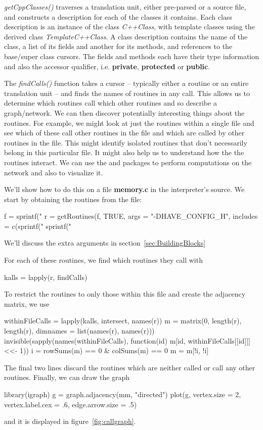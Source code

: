 \documentclass[article]{jss}
\def\Cpp{\proglang{C$++$}}
\def\R{\proglang{R}}
\def\Rpkg#1{\pkg{#1}}
\def\Rfunc#1{\textsl{#1()}}
\def\file#1{\textbf{#1}}
\def\Rclass#1{\textit{#1}}
\def\Cppkeyword#1{\textbf{#1}}
\begin{document}
\Rfunc{getCppClasses} traverses a translation unit, either pre-parsed
or a source file, and constructs a description for each of the \Cpp{}
classes it contains. Each class description is an instance of the
class \Rclass{C++Class}, with template classes using the derived class
\Rclass{TemplateC++Class}.  A class description contains the name of
the class, a list of its fields and another for its methods, and
references to the base/super class cursors.  The fields and methods
each have their type information and also the accessor qualifier,
i.e. \Cppkeyword{private}, \Cppkeyword{protected} or
\Cppkeyword{public}.



The \Rfunc{findCalls} function takes a cursor -- typically either a
routine or an entire translation unit -- and finds the names of
routines in any call.  This allows us to determine which routines call
which other routines and so describe a graph/network.  We can then
discover potentially interesting things about the routines.  For
example, we might look at just the routines within a single file and
see which of these call other routines in the file and which are
called by other routines in the file.  This might identify isolated
routines that don't necessarily belong in this particular file. It
might also help us to understand how the the routines interact.
We can use the \Rpkg{igraph} and \Rpkg{graph} packages to perform
computations on the network and also to visualize it.

We'll show how to do this on a file \file{memory.c} in the \R{}
interpreter's source.
We start by obtaining the routines from the file:
\begin{RCode}
f = sprintf("%
r = getRoutines(f, TRUE, args = "-DHAVE_CONFIG_H",
                  includes = c(sprintf("%
                               sprintf("%
\end{RCode}
We'll discuss the extra arguments in section~\ref{sec:BuildingBlocks}

For each of these routines, we find which routines they call with
\begin{RCode}
kalls = lapply(r, findCalls)
\end{RCode}
To restrict the routines to only those within this file
and create the adjacency matrix, we use 
\begin{RCode}
withinFileCalls = lapply(kalls, intersect, names(r))    
m = matrix(0, length(r), length(r), dimnames = list(names(r), names(r)))
invisible(sapply(names(withinFileCalls), 
           function(id) 
              m[id,  withinFileCalls[[id]]] <<- 1))
i = rowSums(m) == 0 & colSums(m) == 0
m = m[!i, !i]
\end{RCode}
The final two lines discard the routines which are neither called or
call any other routines.
Finally, we can draw the graph
\begin{RCode}
library(igraph)
g = graph.adjacency(mm, "directed")       
plot(g, vertex.size = 2, vertex.label.cex = .6, edge.arrow.size = .5)
\end{RCode}
and it is displayed in figure~\ref{fig:callgraph}.
\end{document}

